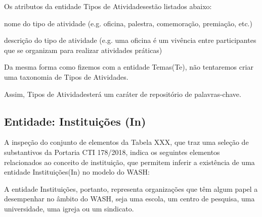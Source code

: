 \documentclass[
12pt,		%
openright,	%
twoside,  %
a4paper,			%
chapter=TITLE,		%
english,			%
french,				%
spanish,			%
brazil				%
]{USPSC-classe/USPSC}
\begin{document}
Os atributos da entidade \textquotedbl Tipos de Atividades\textquotedbl  est\~ao listados abaixo:





\begin{alineas}
\item nome do tipo de atividade (e.g. oficina, palestra, comemora\c{c}\~ao, premia\c{c}\~ao, etc.)
\item descri\c{c}\~ao do tipo de atividade (e.g. \textquotedbl uma oficina \'e um viv\^encia entre participantes que se organizam para realizar atividades pr\'aticas\textquotedbl )
\end{alineas}

Da mesma forma como fizemos com a entidade \textquotedbl Temas\textquotedbl  (Te), n\~ao tentaremos criar uma taxonomia de \textquotedbl Tipos de Atividades\textquotedbl .




Assim, \textquotedbl Tipos de Atividades\textquotedbl  ter\'a um car\'ater de reposit\'orio de palavras-chave.




\subsection[Entidade: Institui\c{c}\~oes (In)]{Entidade: Institui\c{c}\~oes (In)}\label{Entidade: Institui\c{c}\~oes (In)}
A inspe\c{c}\~ao do conjunto de elementos da Tabela XXX, que traz uma sele\c{c}\~ao de substantivos da Portaria CTI 178/2018, indica os seguintes elementos relacionados ao conceito de \textquotedbl institui\c{c}\~ao\textquotedbl , que permitem inferir a exist\^encia de uma entidade \textquotedbl Institui\c{c}\~oes\textquotedbl  (In) no modelo do WASH:





\noindent\begin{center}\mbox{\centering{}}\end{center}


A entidade \textquotedbl Institui\c{c}\~oes\textquotedbl , portanto, representa organiza\c{c}\~oes que t\^em algum papel a desempenhar no \^ambito do WASH, seja uma escola, um centro de pesquisa, uma universidade, uma igreja ou um sindicato.
\end{document}

